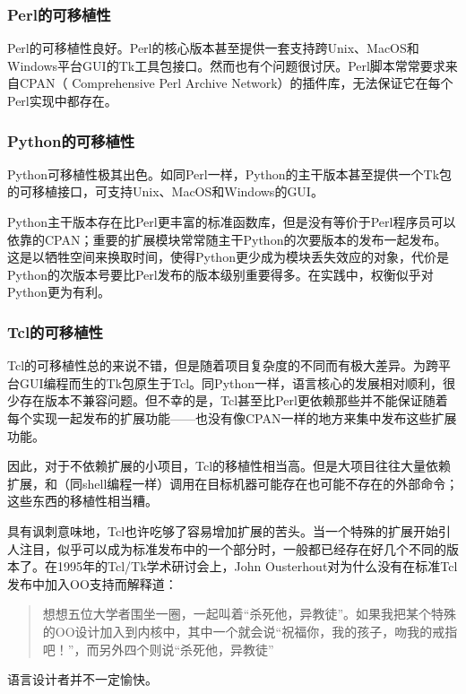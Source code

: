 \documentclass[12pt,oneside]{ctexbook}
\begin{document}
\begin{common-format}
\subsubsection{Perl的可移植性}
Perl的可移植性良好。Perl的核心版本甚至提供一套支持跨Unix、MacOS和Windows平台GUI的Tk工具包接口。然而也有个问题很讨厌。Perl脚本常常要求来自CPAN（ Comprehensive Perl Archive Network）的插件库，无法保证它在每个Perl实现中都存在。

\subsubsection{Python的可移植性}
Python可移植性极其出色。如同Perl一样，Python的主干版本甚至提供一个Tk包的可移植接口，可支持Unix、MacOS和Windows的GUI。

Python主干版本存在比Perl更丰富的标准函数库，但是没有等价于Perl程序员可以依靠的CPAN；重要的扩展模块常常随主干Python的次要版本的发布一起发布。这是以牺牲空间来换取时间，使得Python更少成为模块丢失效应的对象，代价是Python的次版本号要比Perl发布的版本级别重要得多。在实践中，权衡似乎对Python更为有利。

\subsubsection{Tcl的可移植性}
Tcl的可移植性总的来说不错，但是随着项目复杂度的不同而有极大差异。为跨平台GUI编程而生的Tk包原生于Tcl。同Python一样，语言核心的发展相对顺利，很少存在版本不兼容问题。但不幸的是，Tcl甚至比Perl更依赖那些并不能保证随着每个实现一起发布的扩展功能——也没有像CPAN一样的地方来集中发布这些扩展功能。

因此，对于不依赖扩展的小项目，Tcl的移植性相当高。但是大项目往往大量依赖扩展，和（同shell编程一样）调用在目标机器可能存在也可能不存在的外部命令；这些东西的移植性相当糟。

具有讽刺意味地，Tcl也许吃够了容易增加扩展的苦头。当一个特殊的扩展开始引人注目，似乎可以成为标准发布中的一个部分时，一般都已经存在好几个不同的版本了。在1995年的Tcl/Tk学术研讨会上，John Ousterhout对为什么没有在标准Tcl发布中加入OO支持而解释道：

\begin{quote}
想想五位大学者围坐一圈，一起叫着“杀死他，异教徒”。如果我把某个特殊的OO设计加入到内核中，其中一个就会说“祝福你，我的孩子，吻我的戒指吧！”，而另外四个则说“杀死他，异教徒”
\end{quote}

语言设计者并不一定愉快。


\end{common-format}
\end{document}

